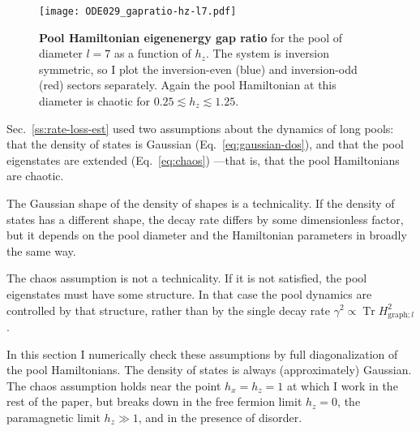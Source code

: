 \documentclass[aps,prb,nofootinbib,twocolumn,balancelastpage,amsmath,amssymb,floatfix,superscriptaddress,]{revtex4-1}
\newcommand{\tr}{\operatorname{Tr}}
\newcommand{\graph}{\mathrm{graph}}
\begin{document}
{\begin{figure}
  \texttt{[image: ODE029\_gapratio-hz-l7.pdf]}
  \caption{
    \textbf{Pool Hamiltonian eigenenergy gap ratio} for the pool of diameter $l = 7$ as a function of $h_z$.
    The system is inversion symmetric, so I plot the inversion-even (blue) and inversion-odd (red) sectors separately.
    Again the pool Hamiltonian at this diameter is chaotic for $0.25 \lesssim h_z \lesssim 1.25$.
  }
  \label{fig:clean-gap-ratio}
\end{figure}

  Sec.~\ref{ss:rate-loss-est} used two assumptions about the dynamics of long pools:
  that the density of states is Gaussian (Eq.~\eqref{eq:gaussian-dos}),
  and that the pool eigenstates are extended (Eq.~\eqref{eq:chaos})%
  ---that is, that the pool Hamiltonians are chaotic.

  The Gaussian shape of the density of shapes is a technicality.
  If the density of states has a different shape,
  the decay rate differs by some dimensionless factor,
  but it depends on the pool diameter and the Hamiltonian parameters in broadly the same way.

  The chaos assumption is not a technicality.
  If it is not satisfied, the pool eigenstates must have some structure.
  In that case the pool dynamics are controlled by that structure,
  rather than by the single decay rate $\gamma^2 \propto \tr H_{\graph;l}^2$.
  
  In this section I numerically check these assumptions by full diagonalization of the pool Hamiltonians.
  The density of states is always (approximately) Gaussian.
  The chaos assumption holds near the point $h_x = h_z = 1$ at which I work in the rest of the paper,
  but breaks down in the free fermion limit $h_z = 0$, the paramagnetic limit $h_z \gg 1$,
  and in the presence of disorder.
  
}
\end{document}
